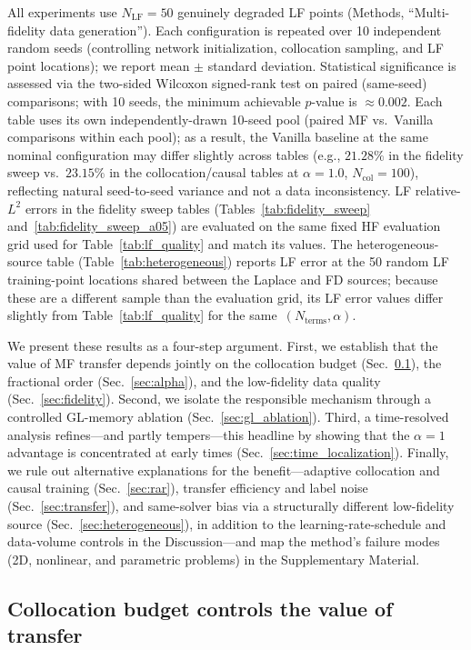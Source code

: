 \documentclass[11pt]{article}
\newcommand{\Ncol}{N_{\mathrm{col}}}
\newcommand{\NLF}{N_{\mathrm{LF}}}
\begin{document}
All experiments use $\NLF = 50$ genuinely degraded LF points (Methods, ``Multi-fidelity data generation''). Each configuration is repeated over 10 independent random seeds (controlling network initialization, collocation sampling, and LF point locations); we report mean $\pm$ standard deviation. Statistical significance is assessed via the two-sided Wilcoxon signed-rank test on paired (same-seed) comparisons; with 10 seeds, the minimum achievable $p$-value is $\approx 0.002$. Each table uses its own independently-drawn 10-seed pool (paired MF vs.\ Vanilla comparisons within each pool); as a result, the Vanilla baseline at the same nominal configuration may differ slightly across tables (e.g., $21.28\%$ in the fidelity sweep vs.\ $23.15\%$ in the collocation/causal tables at $\alpha=1.0$, $\Ncol=100$), reflecting natural seed-to-seed variance and not a data inconsistency. LF relative-$L^2$ errors in the fidelity sweep tables (Tables~\ref{tab:fidelity_sweep} and~\ref{tab:fidelity_sweep_a05}) are evaluated on the same fixed HF evaluation grid used for Table~\ref{tab:lf_quality} and match its values. The heterogeneous-source table (Table~\ref{tab:heterogeneous}) reports LF error at the 50 random LF training-point locations shared between the Laplace and FD sources; because these are a different sample than the evaluation grid, its LF error values differ slightly from Table~\ref{tab:lf_quality} for the same~$(N_{\mathrm{terms}}, \alpha)$.

We present these results as a four-step argument. First, we establish that the value of MF transfer depends jointly on the collocation budget (Sec.~\ref{sec:ncol}), the fractional order (Sec.~\ref{sec:alpha}), and the low-fidelity data quality (Sec.~\ref{sec:fidelity}). Second, we isolate the responsible mechanism through a controlled GL-memory ablation (Sec.~\ref{sec:gl_ablation}). Third, a time-resolved analysis refines---and partly tempers---this headline by showing that the $\alpha = 1$ advantage is concentrated at early times (Sec.~\ref{sec:time_localization}). Finally, we rule out alternative explanations for the benefit---adaptive collocation and causal training (Sec.~\ref{sec:rar}), transfer efficiency and label noise (Sec.~\ref{sec:transfer}), and same-solver bias via a structurally different low-fidelity source (Sec.~\ref{sec:heterogeneous}), in addition to the learning-rate-schedule and data-volume controls in the Discussion---and map the method's failure modes (2D, nonlinear, and parametric problems) in the Supplementary Material.

\subsection{Collocation budget controls the value of transfer}
\label{sec:ncol}
\end{document}
